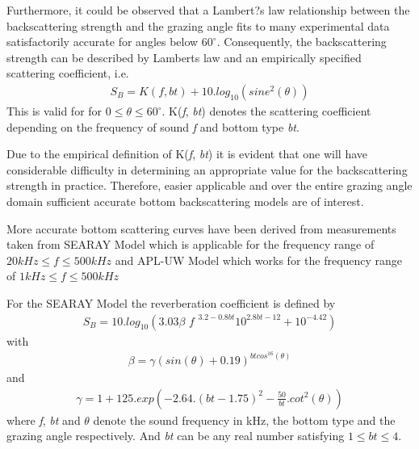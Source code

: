 \noindent Furthermore, it could be observed that a Lambert?s law relationship between the backscattering strength and the grazing angle fits to many experimental data satisfactorily accurate for angles below $60^{\circ}$. Consequently, the backscattering strength can be described by Lamberts law and an empirically specified scattering coefficient, i.e.
\begin{align}
 {S_B}  = K ( \textit{f}, \textit{bt}) + 10 . log_{10}( sine^{2}(\theta)) 
 \end{align}
 \noindent This is valid for for $0 \leq \theta \leq 60^{\circ}$. K(\textit{f}, \textit{bt}) denotes the scattering coefficient depending on the frequency of sound \textit{f} and bottom type \textit{bt}.
 
\noindent Due to the empirical definition of K(\textit{f}, \textit{bt}) it is evident that one will have considerable difficulty in determining an appropriate value for the backscattering strength in practice. Therefore, easier applicable and over the entire grazing angle domain sufficient accurate bottom backscattering models are of interest.

\noindent More accurate bottom scattering curves have been derived from measurements taken from SEARAY Model which is applicable for the frequency range of $20 kHz \leq \textit{f} \leq 500 kHz$ and APL-UW Model which works for the frequency range of $1 kHz \leq \textit{f} \leq 500 kHz$

\noindent For the SEARAY Model the reverberation coefficient is defined by 
\begin{align}
{S_B}  = 10 . log_{10}( 3.03  \beta  \textit{ f } ^{ 3.2 - 0.8 \textit{bt} } 10^{2.8 \textit{bt} - 12} + 10^{-4.42})\end{align}
\noindent with
\begin{align}
\beta = \gamma (sin(\theta) + 0.19)^{\textit{bt}cos^{16}(\theta)}
\end{align}
\noindent and
\begin{align}
\gamma = 1 + 125 . exp( -2.64 . (\textit{bt}-1.75)^{2} - \frac{50}{\textit{bt}} . cot^{2}(\theta))
\end{align}
 \noindent where \textit{f}, \textit{bt} and $\theta$ denote the sound frequency in kHz, the bottom type and the grazing angle respectively. And \textit{bt} can be any real number satisfying $1 \leq \textit{bt} \leq 4.$


